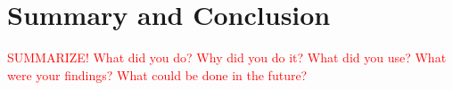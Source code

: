 \chapter{Summary and Conclusion}
\textcolor{red}{SUMMARIZE! What did you do? Why did you do it? What did you use? What were your findings? What could be done in the future?}

